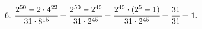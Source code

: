 6. $\cfrac{2^{50}-2\cdot4^{22}}{31\cdot8^{15}}=\cfrac{2^{50}-2^{45}}{31\cdot2^{45}}=\cfrac{2^{45}\cdot(2^5-1)}{31\cdot2^{45}}=\cfrac{31}{31}=1.$\\
